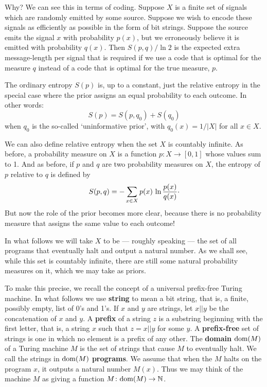 \documentclass[12pt,twoside,openright]{report}
\newcommand{\maps}{\colon}
\newcommand{\N}{\mathbb{N}}
\newcommand{\dom}{\mbox{\rm dom}}
\begin{document}
Why?  We can see this in terms of coding.  Suppose $X$ is a finite set of signals which are randomly emitted by some source. Suppose we wish to encode these signals as efficiently as possible in the form of bit strings.  Suppose the source emits the signal $x$ with probability $p(x)$, but we erroneously believe it is emitted with probability $q(x)$.  Then $S(p,q)/\ln 2$ is the expected extra message-length per signal that is required if we use a code that is optimal for the measure $q$ instead of a code that is optimal for the true measure, $p$.

The ordinary entropy $S(p)$ is, up to a constant, just the relative entropy in the special case where the prior assigns an equal probability to each outcome.  In other words:
\[  S(p) = S(p,q_0) + S(q_0)  \]
when $q_0$ is the so-called `uninformative prior', with $q_0(x) =
1/|X|$ for all $x \in X$.  

We can also define relative entropy when the set $X$ is countably infinite.  As before, a probability measure on $X$ is a function $p
\maps X \to [0,1]$ whose values sum to 1.  And as before, if $p$ and
$q$ are two probability measures on $X$, the entropy of $p$ relative to $q$ is defined by
\begin{equation}
\label{relative_entropy}
  S(p,q) = -\sum_{x \in X} p(x) \, \ln\frac{p(x)}{q(x)} \raisebox{0.4ex}{.}
\end{equation} 
But now the role of the prior becomes more clear, because there is no probability measure that assigns the same value to each outcome!

In what follows we will take $X$ to be --- roughly speaking --- the set of all programs that eventually halt and output a natural number.  As we shall see, while this set is countably infinite, there are still some natural probability measures on it, which we may take as priors.

To make this precise, we recall the concept of a universal prefix-free Turing machine.  In what follows we use {\bf string} to mean a bit string, that is, a finite, possibly empty, list of 0's and
1's.  If $x$ and $y$ are strings, let $x||y$ be the concatenation of
$x$ and $y.$ A \textbf{prefix} of a string $z$ is a substring beginning with the first letter, that is, a string $x$ such that $z =
x||y$ for some $y$.  A \textbf{prefix-free} set of strings is one in which no element is a prefix of any other.  The \textbf{domain}
$\dom(M)$ of a Turing machine $M$ is the set of strings that cause $M$
to eventually halt.  We call the strings in $\dom(M)$
\textbf{programs}.  We assume that when the $M$ halts on the program
$x$, it outputs a natural number $M(x)$.  Thus we may think of the machine $M$ as giving a function $M \maps \dom(M) \to \N$.
\end{document}
